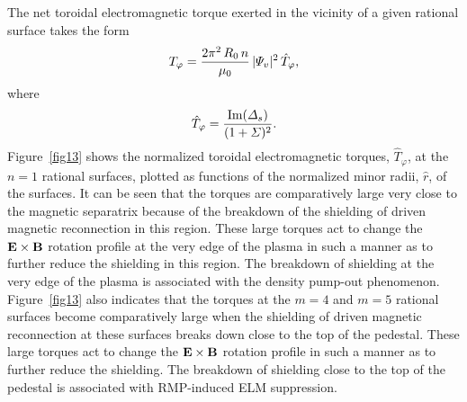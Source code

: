 \documentclass[12pt,prb,aps]{revtex4-1}
\begin{document}
The net toroidal electromagnetic torque exerted in the vicinity of a given rational surface takes the form\,\cite{rf1993} 
\begin{equation}
T_\varphi = \frac{2\pi^2\,R_0\,n}{\mu_0}\,|{\mit\Psi}_v|^2\,\hat{T}_\varphi,
\end{equation}
where
\begin{equation}
\hat{T}_\varphi = \frac{{\rm Im}({\mit\Delta}_s)}{(1+{\mit\Sigma})^2}.
\end{equation}
Figure~\ref{fig13} shows the normalized toroidal electromagnetic torques, $\hat{T}_\varphi$, at the $n=1$ rational surfaces, plotted as functions of the normalized minor radii, $\hat{r}$, of the surfaces. 
It can be seen that the torques are comparatively large very close to the magnetic separatrix because of the breakdown of the shielding of driven magnetic reconnection in this region. These large
torques act to change the ${\bf E}\times {\bf B}$ rotation profile at the very edge of the plasma in such a manner as to further reduce the shielding in this region.\cite{rf1993} The breakdown of shielding  at the very edge of the plasma is associated with the density pump-out phenomenon.\cite{hu,hu1,hu2} Figure~\ref{fig13} also indicates that the torques at the
$m=4$ and $m=5$ rational surfaces become comparatively large when the shielding of driven magnetic reconnection at these surfaces breaks down close to the top of
the pedestal. These large torques act to change the ${\bf E}\times {\bf B}$ rotation profile  in such a manner as to further reduce the shielding.\cite{rf1993} The breakdown of
shielding close to the top of the pedestal is associated with RMP-induced ELM suppression.\cite{hu,hu1,hu2,hu3,hu4}
\end{document}
